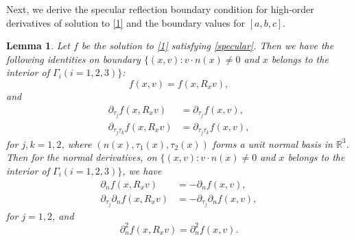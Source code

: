 \documentclass[reqno,a4paper]{amsart}
\newtheorem{Lem}[Thm]{Lemma}
\numberwithin{equation}{section}
\newcommand{\1}{\mathbf{1}}
\newcommand{\R}{\mathbb{R}}
\newcommand{\<}{\langle}
\renewcommand{\>}{\rangle}
\begin{document}
Next, we derive the specular reflection boundary condition for high-order derivatives of solution to \eqref{1} and the boundary values for $[a,b,c]$. 
\begin{Lem}\label{Lem24}
	Let $f$ be the solution to \eqref{1} satisfying \eqref{specular}. Then we have the following identities on boundary $\big\{(x,v) : v\cdot n(x)\neq 0$ and $x$ belongs to the interior of $\Gamma_i(i=1,2,3)\big\}$:
	\begin{equation}\label{115q}
		f(x,v)=f(x,R_xv),
	\end{equation}
	and
	\begin{equation}\label{115c}\begin{aligned}
			\partial_{\tau_j}f(x,R_xv) &= \partial_{\tau_j}f(x,v),\\
			\partial_{\tau_{j}\tau_k}f(x,R_xv) &= \partial_{\tau_j\tau_k}f(x,v),
		\end{aligned}
	\end{equation}for $j,k=1,2$, 
	where $(n(x),\tau_1(x),\tau_2(x))$ forms a unit normal basis in $\R^3$.
	Then for the normal derivatives, on $\big\{(x,v) : v\cdot n(x)\neq 0$ and $x$ belongs to the interior of $\Gamma_i(i=1,2,3)\big\}$, we have
	\begin{align}\label{115}
		\partial_{n}f(x,R_xv) &= -\partial_{n}f(x,v),\\
		\label{115b}
		\partial_{\tau_j}\partial_{n}f(x,R_xv) &= -\partial_{\tau_j}\partial_{n}f(x,v),
	\end{align}
	for $j=1,2$, 
	and
	\begin{equation}\label{115d}
		\partial^2_{n}f(x,R_xv) = \partial^2_{n}f(x,v).
	\end{equation}
\end{Lem}
\end{document}

